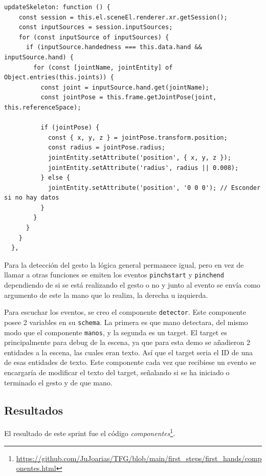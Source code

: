 \documentclass[a4paper, 12pt]{book}
\begin{document}
\begin{lstlisting}[caption=Actualización de las manos, captionpos=b, label=lst:nuevas_manos]
  updateSkeleton: function () {
    const session = this.el.sceneEl.renderer.xr.getSession();
    const inputSources = session.inputSources;
    for (const inputSource of inputSources) {
      if (inputSource.handedness === this.data.hand && inputSource.hand) {
        for (const [jointName, jointEntity] of Object.entries(this.joints)) {
          const joint = inputSource.hand.get(jointName);
          const jointPose = this.frame.getJointPose(joint, this.referenceSpace);
          
          if (jointPose) {
            const { x, y, z } = jointPose.transform.position;
            const radius = jointPose.radius; 
            jointEntity.setAttribute('position', { x, y, z });
            jointEntity.setAttribute('radius', radius || 0.008);
          } else {
            jointEntity.setAttribute('position', '0 0 0'); // Esconder si no hay datos
          }
        }
      }
    }
  },
\end{lstlisting}

Para la detección del gesto la lógica general permanece igual, pero en vez de llamar a otras funciones se emiten los eventos \texttt{pinchstart} y \texttt{pinchend} dependiendo de si se está realizando el gesto o no y junto al evento se envía como argumento de este la mano que lo realiza, la derecha u izquierda.

Para escuchar los eventos, se creo el componente \texttt{detector}. Este componente posee 2 variables en su \texttt{schema}. La primera es que mano detectara, del mismo modo que el componente \texttt{manos}, y la segunda es un target. El target es principalmente para debug de la escena, ya que para esta demo se añadieron 2 entidades a la escena, las cuales 
eran texto. Así que el target seria el ID de una de esas entidades de texto.
Este componente cada vez que recibiese un evento se encargaría de modificar el texto del target, señalando si se ha iniciado o terminado el gesto y de que mano. 

\subsection{Resultados}
\label{subsec:resultados2}
El resultado de este sprint fue el código \textit{componentes}\footnote{\url{https://github.com/JuJoarias/TFG/blob/main/first_steps/first_hands/componentes.html}}.
\end{document}
